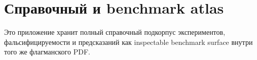 \section{Справочный и benchmark atlas}
\label{sec:oc-core-1-3-reference-benchmark-atlas}

Это приложение хранит полный справочный подкорпус экспериментов,
фальсифицируемости и предсказаний как inspectable benchmark surface внутри
того же флагманского PDF.

\begingroup
\let\ocappendixsection\section
\let\ocappendixsubsection\subsection
\let\ocappendixsubsubsection\subsubsection
\renewcommand{\section}{\ocappendixsubsection}
\renewcommand{\subsection}{\ocappendixsubsubsection}
\scriptsize
\RaggedRight
\sloppy

\endgroup
